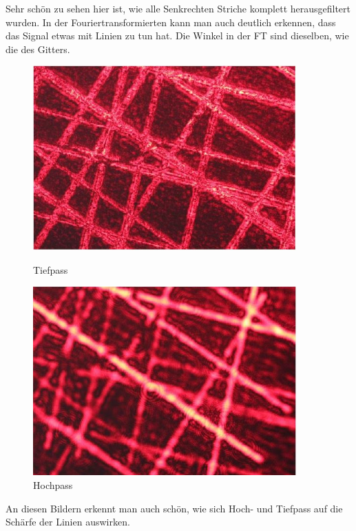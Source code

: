 Sehr schön zu sehen hier ist, wie alle Senkrechten Striche komplett herausgefiltert wurden.
In der Fouriertransformierten kann man auch deutlich erkennen, dass das Signal etwas mit Linien zu tun hat. Die Winkel in der FT sind dieselben, wie die des Gitters.
                \begin{figure}[H]
                  \begin{minipage}{0.45\textwidth}
                   \centering
                    \includegraphics[width=0.9\textwidth]{Abb/Abb_6.JPG}
                    \caption{Tiefpass}
                  \end{minipage}\hfill
                  \begin{minipage}{0.45\textwidth}
                   \centering
                    \includegraphics[width=0.9\textwidth]{Abb/Abb_7.JPG}
                    \caption{Hochpass}
                  \end{minipage}
                \end{figure}
An diesen Bildern erkennt man auch schön, wie sich Hoch- und Tiefpass auf die Schärfe der Linien auswirken. 

